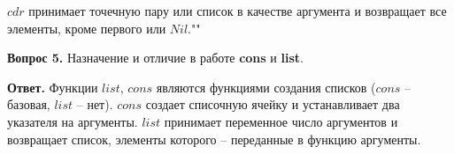 \documentclass[12pt]{report}
\begin{document}
$cdr$ принимает точечную пару или список в качестве аргумента и возвращает все элементы, кроме первого или $Nil$.""\newline
	
\textbf{Вопрос 5.} Назначение и отличие в работе \textbf{cons} и \textbf{list}.
	
\textbf{Ответ.} Функции $list$, $cons$ являются функциями создания списков
($cons$ – базовая, $list$ – нет). $cons$ создает списочную ячейку и устанавливает два указателя на аргументы. $list$ принимает переменное число аргументов и возвращает список, элементы которого – переданные в функцию аргументы.
	
	
	
	
\end{document}
